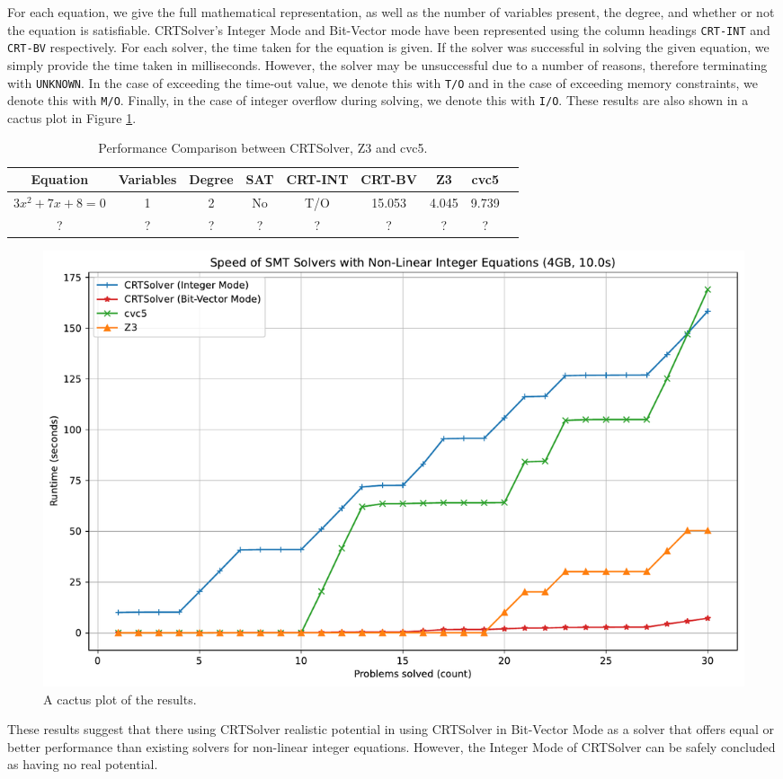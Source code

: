 For each equation, we give the full mathematical representation, as well as the number of variables present,
the degree, and whether or not the equation is satisfiable. CRTSolver's Integer Mode and Bit-Vector mode have
been represented using the column headings \texttt{CRT-INT} and \texttt{CRT-BV} respectively. For each solver,
the time taken for the equation is given. If the solver was successful in solving the given 
equation, we simply provide the time taken in milliseconds. However, the solver may be unsuccessful due to
a number of reasons, therefore terminating with \texttt{UNKNOWN}. In the case of exceeding the time-out value,
we denote this with \texttt{T/O} and in the case of exceeding memory constraints, we denote this with 
\texttt{M/O}. Finally, in the case of integer overflow during solving, we denote this with \texttt{I/O}.
These results are also shown in a cactus plot in Figure \ref{figure:cactus-plot}.

\begin{table}
  \caption{Performance Comparison between CRTSolver, Z3 and cvc5.}
  \label{table:results}
  \begin{tabular}{ccccccccc}
    \toprule
    Equation & Variables & Degree & SAT & CRT-INT & CRT-BV & Z3 & cvc5 \\
    \midrule
    $3x^2 + 7x + 8 = 0$ & 1 & 2 & No & T/O & 15.053 & 4.045 & 9.739 \\
    ? & ? & ? & ? & ? & ? & ? & ? \\
  \bottomrule
\end{tabular}
\end{table}

\begin{figure}
    \vspace{4em}
    \centering
    \includegraphics[width=1.0\linewidth]{cactus.pdf}
  \caption{A cactus plot of the results.}
  \label{figure:cactus-plot}
\end{figure}

These results suggest that there using CRTSolver realistic potential in using CRTSolver in Bit-Vector Mode
as a solver that offers equal or better performance than existing solvers for non-linear
integer equations. However, the Integer Mode of CRTSolver can be safely concluded as having no real potential.
